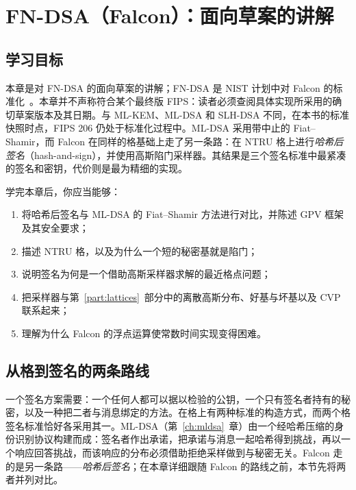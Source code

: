 \chapter{FN-DSA（Falcon）：面向草案的讲解}
\label{ch:fndsa}

\section{学习目标}

本章是对 FN-DSA 的面向草案的讲解；FN-DSA 是 NIST 计划中对 Falcon 的标准化~\cite{fips206,falcon2020}。本章并不声称符合某个最终版 FIPS：读者必须查阅具体实现所采用的确切草案版本及其日期。与 ML-KEM、ML-DSA 和 SLH-DSA 不同，在本书的标准快照时点，FIPS 206 仍处于标准化过程中。ML-DSA 采用带中止的 Fiat--Shamir，而 Falcon 在同样的格基础上走了另一条路：在 NTRU 格上进行\emph{哈希后签名}（hash-and-sign），并使用高斯陷门采样器。其结果是三个签名标准中最紧凑的签名和密钥，代价则是最为精细的实现。

学完本章后，你应当能够：

\begin{enumerate}
  \item 将哈希后签名与 ML-DSA 的 Fiat--Shamir 方法进行对比，并陈述 GPV 框架及其安全要求；
  \item 描述 NTRU 格，以及为什么一个短的秘密基就是陷门；
  \item 说明签名为何是一个借助高斯采样器求解的最近格点问题；
  \item 把采样器与第~\ref{part:lattices}~部分中的离散高斯分布、好基与坏基以及 CVP 联系起来；
  \item 理解为什么 Falcon 的浮点运算使常数时间实现变得困难。
\end{enumerate}

\section{从格到签名的两条路线}
\label{sec:hash-and-sign-vs-fs}

一个签名方案需要：一个任何人都可以据以检验的公钥，一个只有签名者持有的秘密，以及一种把二者与消息绑定的方法。在格上有两种标准的构造方式，而两个格签名标准恰好各采用其一。ML-DSA（第~\ref{ch:mldsa}~章）由一个经哈希压缩的身份识别协议构建而成：签名者作出承诺，把承诺与消息一起哈希得到挑战，再以一个响应回答挑战，而该响应的分布必须借助拒绝采样做到与秘密无关。Falcon 走的是另一条路——\emph{哈希后签名}；在本章详细跟随 Falcon 的路线之前，本节先将两者并列对比。


